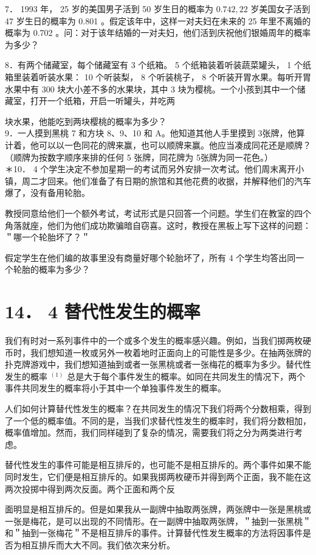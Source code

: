 7． 1993 年， 25 岁的美国男子活到 50 岁生日的概率为 $0.742,22$ 岁美国女子活到 47 岁生日的概率为 0.801 。假定该年中，这样一对夫妇在未来的 25 年里不离婚的概率为 0.702 。问：对于该年结婚的一对夫妇，他们活到庆祝他们银婚周年的概率为多少？

8．有两个储藏室，每个储藏室有 3 个纸箱。 5 个纸箱装着听装蔬菜罐头， 1 个纸箱里装着听装水果： 10 个听装梨， 8 个听装桃子， 8 个听装开胃水果。每听开胃水果中有 300 块大小差不多的水果块，其中 3 块为樱桃。一个小孩到其中一个储藏室，打开一个纸箱，开启一听罐头，并吃两

块水果，他能吃到两块樱桃的概率为多少？\\
9．一人摸到黑桃 7 和方块 8、9、10 和 A。他知道其他人手里摸到 3张牌，他算计着，他可以以一色同花的牌来赢，也可以顺牌来赢。他应当凑成同花还是顺牌？（顺牌为按数字顺序来排的任何 5 张牌，同花牌为 5张牌为同一花色。）\\
＊10． 4 个学生决定不参加星期一的考试而另外安排一次考试。他们周末离开小镇，周二才回来。他们准备了有日期的旅馆和其他花费的收据，并解释他们的汽车爆了，没有备用轮胎。

教授同意给他们一个额外考试，考试形式是只回答一个问题。学生们在教室的四个角落就座，他们为他们成功欺骗暗自窃喜。这时，教授在黑板上写下这样的问题：＂哪一个轮胎坏了？＂

假定学生在他们编的故事里没有商量好哪个轮胎坏了，所有 4 个学生均答出同一个轮胎的概率为多少？

\section*{14． 4 替代性发生的概率}
我们有时对一系列事件中的一个或多个发生的概率感兴趣。例如，当我们掷两枚硬币时，我们想知道一枚或另外一枚着地时正面向上的可能性是多少。在抽两张牌的扑克牌游戏中，我们想知道抽到或者一张黑桃或者一张梅花的概率为多少。替代性发生的概率 ${ }^{(1)}$ 总是大于每个事件发生的概率。如同在共同发生的情况下，两个事件共同发生的概率将小于其中一个单独事件发生的概率。

人们如何计算替代性发生的概率？在共同发生的情况下我们将两个分数相乘，得到了一个低的概率值。不同的是，当我们求替代性发生的概率时，我们将分数相加，概率值增加。然而，我们同样碰到了复杂的情况，需要我们将之分为两类进行考虑。

替代性发生的事件可能是相互排斥的，也可能不是相互排斥的。两个事件如果不能同时发生，它们便是相互排斥的。如果我掷两枚硬币并得到两个正面，我不能在这两次投掷中得到两次反面。两个正面和两个反

面明显是相互排斥的。但是如果我从一副牌中抽取两张牌，两张牌中一张是黑桃或一张是梅花，是可以出现的不同情形。在一副牌中抽取两张牌，＂抽到一张黑桃＂和＂抽到一张梅花＂不是相互排斥的事件。计算替代性发生概率的方法将因事件是否为相互排斥而大大不同。我们依次来分析。

